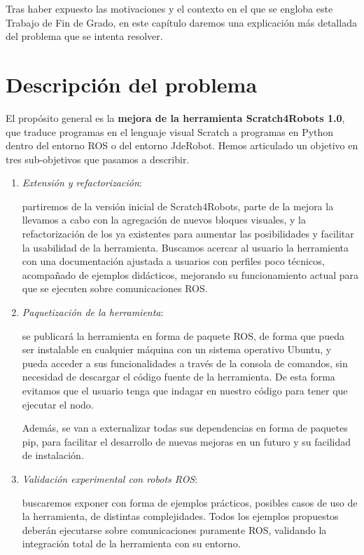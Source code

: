 Tras haber expuesto las motivaciones y el contexto en el que se engloba este Trabajo de Fin de Grado, en este capítulo daremos una explicación más detallada del problema que se intenta resolver.\\ 

\section{Descripción del problema}
\label{sec:descripcion del problema}
El propósito general es la \textbf{mejora de la herramienta Scratch4Robots 1.0}, que traduce programas en el lenguaje visual Scratch a programas en Python dentro del entorno ROS o del entorno JdeRobot. Hemos articulado un objetivo en tres sub-objetivos que pasamos a describir.
\begin{enumerate}
\item \textit{Extensión y refactorización}:

 partiremos de la versión inicial de Scratch4Robots, parte de la mejora la llevamos a cabo con la agregación de nuevos bloques visuales, y la refactorización de los ya existentes para aumentar las posibilidades y facilitar la usabilidad de la herramienta. Buscamos acercar al usuario la herramienta con una documentación ajustada a usuarios con perfiles poco técnicos, acompañado de ejemplos didácticos, mejorando su funcionamiento actual para que se ejecuten sobre comunicaciones ROS.

\item \textit{Paquetización de la herramienta}:

 se publicará la herramienta en forma de paquete ROS, de forma que pueda ser instalable en cualquier máquina con un sistema operativo Ubuntu, y pueda acceder a sus funcionalidades a través de la consola de comandos, sin necesidad de descargar el código fuente de la herramienta. De esta forma evitamos que el usuario tenga que indagar en nuestro código para tener que ejecutar el nodo.

 Además, se van a externalizar todas sus dependencias en forma de paquetes pip, para facilitar el desarrollo de nuevas mejoras en un futuro y su facilidad de instalación.

\item \textit{Validación experimental con robots ROS}:

 buscaremos exponer con forma de ejemplos prácticos, posibles casos de uso de la herramienta, de distintas complejidades. Todos los ejemplos propuestos deberán ejecutarse sobre comunicaciones puramente ROS, validando la integración total de la herramienta con su entorno.
\end{enumerate}


